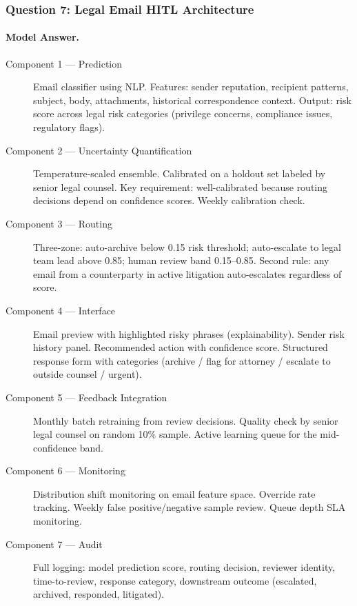 \subsubsection{Question 7: Legal Email HITL Architecture}

\paragraph{Model Answer.}

\begin{description}
    \item[Component 1 --- Prediction] Email classifier using NLP. Features: sender reputation, recipient patterns, subject, body, attachments, historical correspondence context. Output: risk score across legal risk categories (privilege concerns, compliance issues, regulatory flags).

    \item[Component 2 --- Uncertainty Quantification] Temperature-scaled ensemble. Calibrated on a holdout set labeled by senior legal counsel. Key requirement: well-calibrated because routing decisions depend on confidence scores. Weekly calibration check.

    \item[Component 3 --- Routing] Three-zone: auto-archive below 0.15 risk threshold; auto-escalate to legal team lead above 0.85; human review band 0.15--0.85. Second rule: any email from a counterparty in active litigation auto-escalates regardless of score.

    \item[Component 4 --- Interface] Email preview with highlighted risky phrases (explainability). Sender risk history panel. Recommended action with confidence score. Structured response form with categories (archive / flag for attorney / escalate to outside counsel / urgent).

    \item[Component 5 --- Feedback Integration] Monthly batch retraining from review decisions. Quality check by senior legal counsel on random 10\% sample. Active learning queue for the mid-confidence band.

    \item[Component 6 --- Monitoring] Distribution shift monitoring on email feature space. Override rate tracking. Weekly false positive/negative sample review. Queue depth SLA monitoring.

    \item[Component 7 --- Audit] Full logging: model prediction score, routing decision, reviewer identity, time-to-review, response category, downstream outcome (escalated, archived, responded, litigated).
\end{description}

